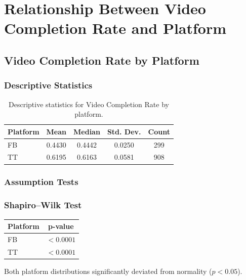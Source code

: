 \section{Relationship Between Video Completion Rate and Platform}
\label{appendix:video_completion_rate_platform_analysis}

\subsection{Video Completion Rate by Platform}
\label{appendix:video_completion_rate_platform_analysis_VCR}

\subsubsection{Descriptive Statistics}

\begin{table}[H]
	\centering
	\caption{Descriptive statistics for Video Completion Rate by platform.}
	\begin{tabular}{lcccc}
		\toprule
		Platform & Mean & Median & Std. Dev. & Count \\
		\midrule
		FB & 0.4430 & 0.4442 & 0.0250 & 299 \\
		TT & 0.6195 & 0.6163 & 0.0581 & 908 \\
		\bottomrule
	\end{tabular}
\end{table}

\subsubsection{Assumption Tests}

\subsubsection{Shapiro--Wilk Test}

\begin{table}[H]
	\centering
	\begin{tabular}{lc}
		\toprule
		Platform & p-value \\
		\midrule
		FB & $<0.0001$ \\
		TT & $<0.0001$ \\
		\bottomrule
	\end{tabular}
\end{table}

Both platform distributions significantly deviated from normality ($p<0.05$).


